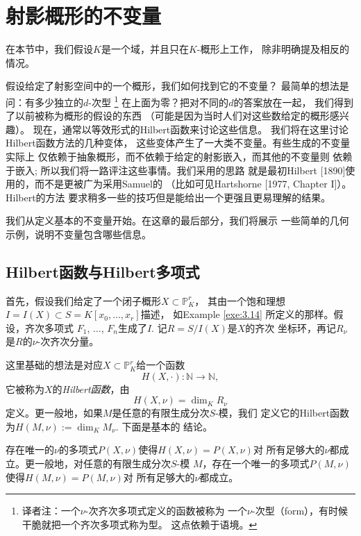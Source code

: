 \section{射影概形的不变量}\label{s:3.3}

在本节中，我们假设$K$是一个域，并且只在$K$-概形上工作，
除非明确提及相反的情况。

假设给定了射影空间中的一个概形，我们如何找到它的不变量？
最简单的想法是问：有多少独立的$d$-次型%
\footnote{译者注：一个$\nu$-次齐次多项式定义的函数被称为
一个$\nu$-次型（form），有时候干脆就把一个齐次多项式称为型。
这点依赖于语境。}%
在上面为零？把对不同的$d$的答案放在一起，
我们得到了以前被称为概形的假设的东西
（可能是因为当时人们对这些数给定的概形感兴趣）。 
现在，通常以等效形式的Hilbert函数来讨论这些信息。
我们将在这里讨论Hilbert函数方法的几种变体，
这些变体产生了一大类不变量。有些生成的不变量实际上
仅依赖于抽象概形，而不依赖于给定的射影嵌入，而其他的不变量则
依赖于嵌入; 所以我们将一路评注这些事情。我们采用的思路%
就是最初Hilbert [1890]使用的，而不是更被广为采用Samuel的
（比如可见Hartshorne [1977, Chapter I]）。 Hilbert的方法
要求稍多一些的技巧但是能给出一个更强且更易理解的结果。

我们从定义基本的不变量开始。在这章的最后部分，我们将展示
一些简单的几何示例，说明不变量包含哪些信息。

\subsection{Hilbert函数与Hilbert多项式}\label{s:3.3.1}

首先，假设我们给定了一个闭子概形$X\subset \mathbb P^r_K$，
其由一个饱和理想$I=I(X)\subset S=K[x_0,\dots,x_r]$描述，
如Example \ref{exe:3.14} 所定义的那样。假设，齐次多项式
$F_1$, $\dots$, $F_n$生成了$I$. 记$R=S/I(X)$是$X$的齐次
坐标环，再记$R_\nu$是$R$的$\nu$-次齐次分量。

这里基础的想法是对应$X\subset \mathbb P^r_K$给一个函数
\[
	H(X,\cdot):\mathbb N\to \mathbb N,
\]
它被称为$X$的\textit{Hilbert函数}，由
\[
	H(X,\nu)=\dim_K R_\nu
\]
定义。更一般地，如果$M$是任意的有限生成分次$S$-模，我们
定义它的Hilbert函数为$H(M,\nu):=\dim_K M_\nu$. 下面是基本的
结论。

\begin{thm}[Hilbert]\label{thm:3.55}
存在唯一的$\nu$的多项式$P(X,\nu)$使得$H(X,\nu)=P(X,\nu)$对
所有足够大的$\nu$都成立。更一般地，对任意的有限生成分次$S$-模
$M$，存在一个唯一的多项式$P(M,\nu)$使得$H(M,\nu)=P(M,\nu)$对
所有足够大的$\nu$都成立。
\end{thm}

